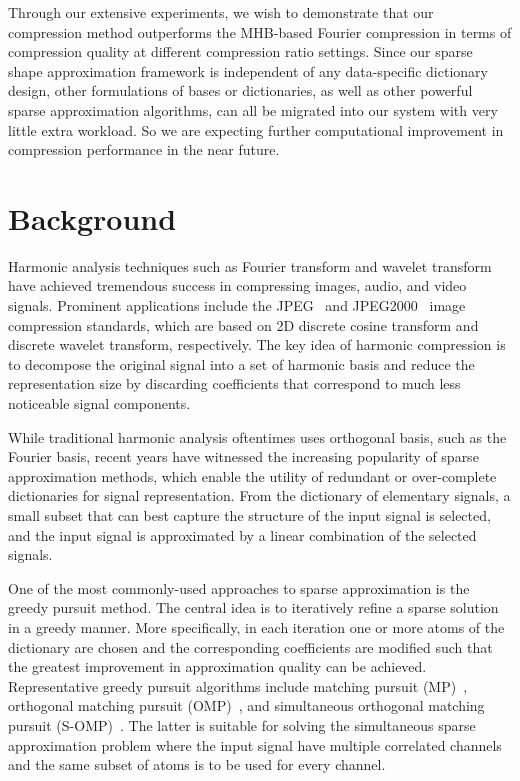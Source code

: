 Through our extensive experiments, we wish to demonstrate that our
compression method outperforms the MHB-based Fourier compression in
terms of compression quality at different compression ratio settings.
Since our sparse shape approximation framework is independent of any
data-specific dictionary design, other formulations of bases or
dictionaries, as well as other powerful sparse approximation
algorithms, can all be migrated into our system with very little extra
workload. So we are expecting further computational improvement in
compression performance in the near future.


\section{Background}

Harmonic analysis techniques such as Fourier transform and wavelet
transform have achieved tremendous success in compressing images,
audio, and video signals. Prominent applications include the
JPEG~\cite{wallace1992jpeg} and JPEG2000~\cite{skodras2001jpeg} image
compression standards, which are based on 2D discrete cosine transform
and discrete wavelet transform, respectively. The key idea of harmonic
compression is to decompose the original signal into a set of harmonic
basis and reduce the representation size by discarding coefficients
that correspond to much less noticeable signal components.

While traditional harmonic analysis oftentimes uses orthogonal basis,
such as the Fourier basis, recent years have witnessed the increasing
popularity of sparse approximation methods, which enable the utility
of redundant or over-complete dictionaries for signal representation.
From the dictionary of elementary signals, a small subset that can
best capture the structure of the input signal is selected, and the
input signal is approximated by a linear combination of the selected
signals.

One of the most commonly-used approaches to sparse approximation is
the greedy pursuit method. The central idea is to iteratively refine a
sparse solution in a greedy manner. More specifically, in each
iteration one or more atoms of the dictionary are chosen
and the corresponding coefficients are modified
such that the greatest improvement in approximation quality can be achieved.
Representative greedy pursuit algorithms include matching pursuit
(MP)~\cite{Mallat1993}, orthogonal matching pursuit
(OMP)~\cite{Pati1993}, and simultaneous orthogonal matching pursuit (S-OMP)~\cite{Tropp2006a}.
The latter is suitable for solving the simultaneous sparse approximation problem where
the input signal have multiple correlated channels and the same subset of atoms is to be used
for every channel.

